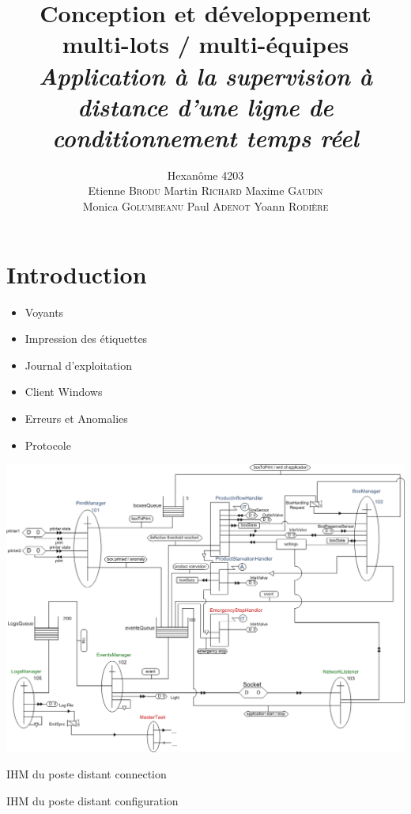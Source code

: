 \documentclass{beamer}
\title{Conception et développement multi-lots / multi-équipes\\ \emph{Application à la supervision à distance d'une ligne de conditionnement temps réel}}
\author{Hexanôme 4203\\ Etienne \textsc{Brodu} Martin \textsc{Richard} Maxime \textsc{Gaudin}\\ Monica \textsc{Golumbeanu} Paul \textsc{Adenot} Yoann \textsc{Rodière}}
\begin{document}
	\begin{frame}
		\titlepage
	\end{frame}

\section{Introduction}
	\begin{frame}
		\begin{itemize}	
			\item Voyants
			\item Impression des étiquettes %
			\item Journal d'exploitation
			\item Client Windows
			\item Erreurs et Anomalies
			\item Protocole
		\end{itemize}
	\end{frame}

	\begin{frame}
		\includegraphics[width=\textwidth]{../../SchemasLCG/schemaGlobal.png}
	\end{frame}

	\begin{frame}
		IHM du poste distant
		connection
	\end{frame}

	\begin{frame}
		IHM du poste distant
		configuration
	\end{frame}
\end{document}
